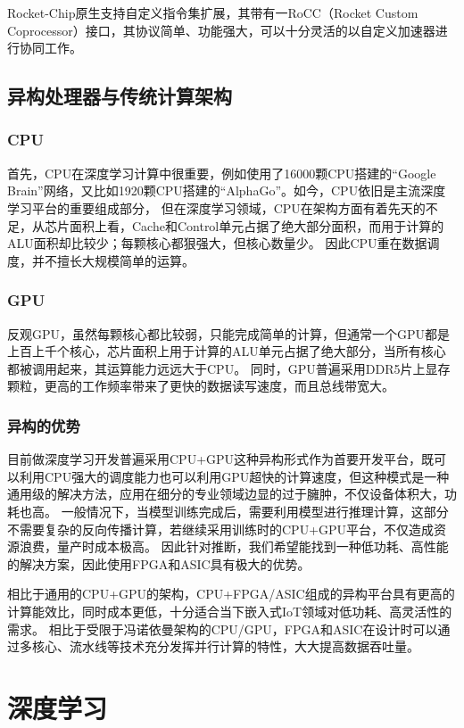     Rocket-Chip原生支持自定义指令集扩展，其带有一RoCC（Rocket Custom Coprocessor）接口，其协议简单、功能强大，可以十分灵活的以自定义加速器进行协同工作。
    
    \subsection{异构处理器与传统计算架构}
            \subsubsection{CPU}
            首先，CPU在深度学习计算中很重要，例如使用了16000颗CPU搭建的“Google Brain”网络，又比如1920颗CPU搭建的“AlphaGo”。如今，CPU依旧是主流深度学习平台的重要组成部分，
            但在深度学习领域，CPU在架构方面有着先天的不足，从芯片面积上看，Cache和Control单元占据了绝大部分面积，而用于计算的ALU面积却比较少；每颗核心都狠强大，但核心数量少。
            因此CPU重在数据调度，并不擅长大规模简单的运算。
            \subsubsection{GPU}
            反观GPU，虽然每颗核心都比较弱，只能完成简单的计算，但通常一个GPU都是上百上千个核心，芯片面积上用于计算的ALU单元占据了绝大部分，当所有核心都被调用起来，其运算能力远远大于CPU。
            同时，GPU普遍采用DDR5片上显存颗粒，更高的工作频率带来了更快的数据读写速度，而且总线带宽大。
            \subsubsection{异构的优势}
            目前做深度学习开发普遍采用CPU+GPU这种异构形式作为首要开发平台，既可以利用CPU强大的调度能力也可以利用GPU超快的计算速度，但这种模式是一种通用级的解决方法，应用在细分的专业领域边显的过于臃肿，不仅设备体积大，功耗也高。
            一般情况下，当模型训练完成后，需要利用模型进行推理计算，这部分不需要复杂的反向传播计算，若继续采用训练时的CPU+GPU平台，不仅造成资源浪费，量产时成本极高。
            因此针对推断，我们希望能找到一种低功耗、高性能的解决方案，因此使用FPGA和ASIC具有极大的优势。

            相比于通用的CPU+GPU的架构，CPU+FPGA/ASIC组成的异构平台具有更高的计算能效比，同时成本更低，十分适合当下嵌入式IoT领域对低功耗、高灵活性的需求。
            相比于受限于冯诺依曼架构的CPU/GPU，FPGA和ASIC在设计时可以通过多核心、流水线等技术充分发挥并行计算的特性，大大提高数据吞吐量。

\section{深度学习}
